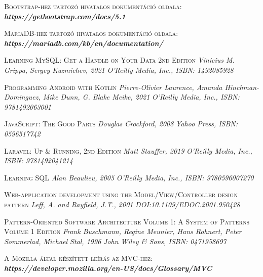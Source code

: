 \documentclass[
]{thesis-ekf}
\theoremstyle{definition}
\theoremstyle{remark}
\begin{document}
\begin{thebibliography}{2}
		\textsc{Bootstrap-hez tartozó hivatalos dokumentáció oldala:}
		\newline
		\emph{\bf{https://getbootstrap.com/docs/5.1}}
		
		\textsc{MariaDB-hez tartozó hivatalos dokumentáció oldala:}
		\newline
		\emph{\bf{https://mariadb.com/kb/en/documentation/}}
		
		\textsc{Learning MySQL: Get a Handle on Your Data 2nd Edition}
		\newline
		\emph{Vinicius M. Grippa, Sergey Kuzmichev,  2021}
		\emph{O'Reilly Media, Inc., ISBN: 1492085928}
		
		\textsc{Programming Android with Kotlin}
		\newline
		\emph{Pierre-Olivier Laurence, Amanda Hinchman-Dominguez, Mike Dunn, G. Blake Meike,  2021}
		\emph{O'Reilly Media, Inc., ISBN: 9781492063001}
		
		\textsc{JavaScript: The Good Parts}
		\newline
		\emph{Douglas Crockford, 2008}
		\emph{Yahoo Press, ISBN: 0596517742}
		
		\textsc{Laravel: Up \& Running, 2nd Edition}
		\newline
		\emph{Matt Stauffer, 2019}
		\emph{O'Reilly Media, Inc., ISBN: 9781492041214}
		
		\textsc{Learning SQL}
		\newline
		\emph{Alan Beaulieu, 2005}
		\emph{O'Reilly Media, Inc., ISBN: 9780596007270}
		
		\textsc{Web-application development using the Model/View/Controller design pattern}
		\newline
		\emph{Leff, A. and Rayfield, J.T., 2001}
		\emph{DOI:10.1109/EDOC.2001.950428}
		
		\textsc{Pattern-Oriented Software Architecture Volume 1: A System of Patterns Volume 1 Edition}
		\newline
		\emph{Frank Buschmann, Regine Meunier, Hans Rohnert, Peter Sommerlad, Michael Stal, 1996}
		\emph{John Wiley \& Sons, ISBN: 0471958697}
		
		\textsc{A Mozilla által készített leírás az MVC-hez:}
		\newline
		\emph{\bf{https://developer.mozilla.org/en-US/docs/Glossary/MVC}}
		

\end{thebibliography}
\end{document}
